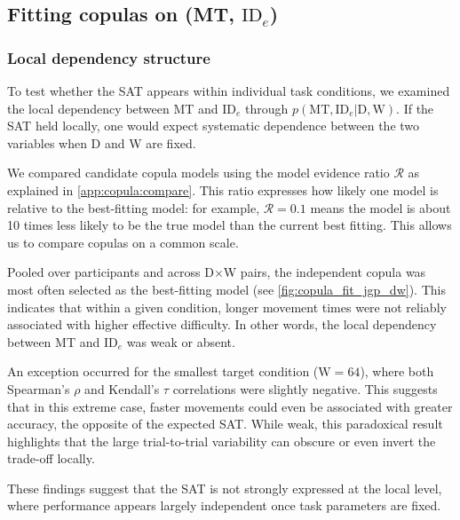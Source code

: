 \documentclass[acmlarge, manuscript,review]{acmart}
\newcommand{\mt}{\ensuremath{{\text{MT}}}\xspace}
\newcommand{\ide}{\ensuremath{{\text{ID}_e}}\xspace}
\newcommand{\D}{\ensuremath{{\text{D}}}\xspace}
\newcommand{\W}{\ensuremath{{\text{W}}}\xspace}
\begin{document}


\subsection{Fitting copulas on (MT, \ide) \label{sub:jgp::fit_copula}}

\subsubsection{Local dependency structure}
To test whether the SAT appears within individual task conditions, we examined the local dependency between MT and \ide through $p(\mt, \ide | \D, \W)$. If the SAT held locally, one would expect systematic dependence between the two variables when D and W are fixed. 

We compared candidate copula models using the model evidence ratio $\mathcal{R}$ as explained in \autoref{app:copula:compare}. This ratio expresses how likely one model is relative to the best-fitting model: for example, $\mathcal{R}=0.1$ means the model is about 10 times less likely to be the true model than the current best fitting. This allows us to compare copulas on a common scale.


Pooled over participants and across D$\times$W pairs, the independent copula was most often selected as the best-fitting model (see %
\autoref{fig:copula_fit_jgp_dw}). This indicates that within a given condition, longer movement times were not reliably associated with higher effective difficulty. In other words, the local dependency between MT and \ide was weak or absent. 

An exception occurred for the smallest target condition ($\W=64$), where both Spearman's $\rho$ and Kendall's $\tau$ correlations were slightly negative. This suggests that in this extreme case, faster movements could even be associated with greater accuracy, the opposite of the expected SAT. While weak, this paradoxical result highlights that the large trial-to-trial variability can obscure or even invert the trade-off locally.

These findings suggest that the SAT is not strongly expressed at the local level, where performance appears largely independent once task parameters are fixed.
\end{document}

